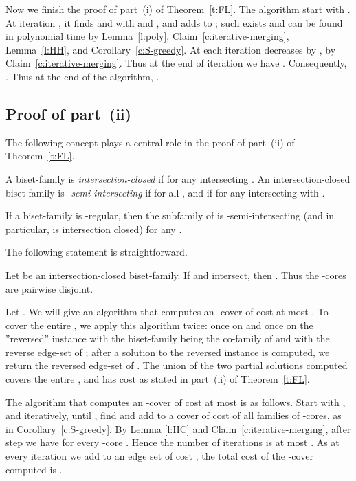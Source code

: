 Now we finish the proof of part~(i) of Theorem~\ref{t:FL}.
The algorithm start with .
At iteration , it finds  and  with 
 and 
, and adds  to ; 
such  exists and can be found in polynomial time by 
Lemma~\ref{l:poly},
Claim~\ref{c:iterative-merging},
Lemma~\ref{l:HH}, and
Corollary~\ref{c:S-greedy}.
At each iteration  decreases by , by Claim~\ref{c:iterative-merging}.
Thus at the end of iteration  we have .
Consequently, .
Thus at the end of the algorithm, 
.

\subsection{Proof of part~(ii)} \label{s:main}

The following concept plays a central role in the proof of part~(ii) of Theorem~\ref{t:FL}.

\begin{definition} \label{d:q}
A biset-family  is {\em intersection-closed} if 
for any intersecting .
An intersection-closed biset-family  is {\em -semi-intersecting} if 
 for all , and if 
 for any intersecting  with .
\end{definition}



\begin{fact} \label{f:q}
If a biset-family  is -regular, then the subfamily 
 of  is -semi-intersecting 
(and in particular, is intersection closed) for any .
\end{fact}


The following statement is straightforward.

\begin{lemma} \label{l:HC}
Let  be an intersection-closed biset-family.
If  and  intersect, then .
Thus the -cores are pairwise disjoint.
\end{lemma}

Let .
We will give an algorithm that computes an -cover of cost at most
.
To cover the entire , we apply this algorithm twice: 
once on  and once on the ''reversed'' instance with the biset-family being the co-family 
 of  and with the reverse edge-set  of ;
after a solution  to the reversed instance is computed, we return the reversed edge-set of .
The union of the two partial solutions computed covers the entire ,
and has cost as stated in part~(ii) of Theorem~\ref{t:FL}.

The algorithm that computes an -cover of cost at most 
 is as follows.
Start with , and iteratively, until , find and add to 
a cover  of cost 
of all families  of -cores, as in Corollary~\ref{c:S-greedy}.
By Lemma \ref{l:HC} and Claim~\ref{c:iterative-merging}, 
after step  we have  for every -core .
Hence the number of iterations is at most . 
As at every iteration we add to  an edge set of cost , the total
cost of the -cover computed is .

